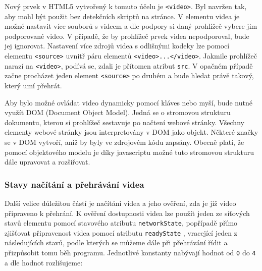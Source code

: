 Nový prvek v HTML5 vytvořený k tomuto účelu je \texttt{<video>}. Byl navržen tak, aby mohl být použit bez detekčních skriptů na stránce. V elementu videa je možné nastavit více souborů s videem a dle podpory si daný prohlížeč vybere jim podporované video. V případě, že by prohlížeč prvek videa nepodporoval, bude jej ignorovat. Nastavení více zdrojů videa s odlišnými kodeky lze pomocí elementu \texttt{<source>} uvnitř páru elementů \texttt{<video>...</video>}. Jakmile prohlížeč narazí na \texttt{<video>}, podívá se, zdali je přítomen atribut \texttt{src}. V opačném případě začne procházet jeden element \texttt{<source>} po druhém a bude hledat právě takový, který umí přehrát.

Aby bylo možné ovládat video dynamicky pomocí kláves nebo myší, bude nutné využít DOM (Document Object Model). Jedná se o stromovou strukturu dokumentu, kterou si prohlížeč sestavuje po načtení webové stránky. Všechny elementy webové stránky jsou interpretovány v DOM jako objekt. Některé značky se v DOM vytvoří, aniž by byly ve zdrojovém kódu zapsány. Obecně platí, že pomocí objektového modelu je díky javascriptu možné tuto stromovou strukturu dále upravovat a rozšiřovat. 



\subsubsection{Stavy načítání a přehrávání videa}
Další velice důležitou částí je načítáni videa a jeho ověření, zda je již video připraveno k přehrání. K ověření dostupnosti videa lze použít jeden ze síťových stavů elementu pomocí stavového atributu \texttt{networkState}, popřípadě přímo zjišťovat připravenost videa pomocí atributu \texttt{readyState} \cite{html5}, vracející jeden z následujících stavů, podle kterých se můžeme dále při přehrávání řídit a přizpůsobit tomu běh programu. Jednotlivé konstanty nabývají hodnot od \texttt{0} do \texttt{4} a dle hodnot rozlišujeme:


